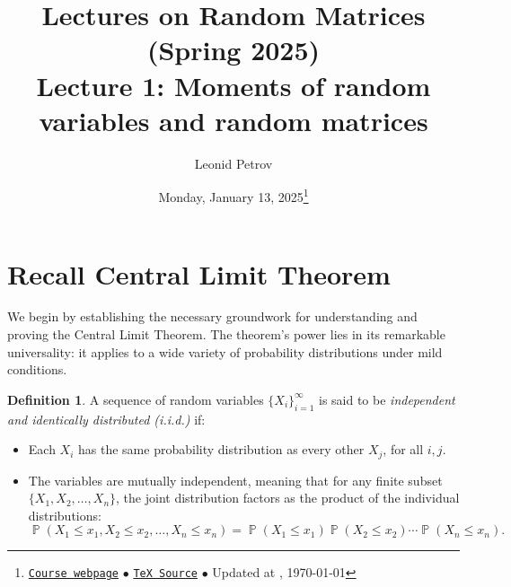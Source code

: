 \documentclass[letterpaper,11pt,oneside,reqno]{article}
\numberwithin{equation}{section}
\theoremstyle{definition}
\newtheorem{definition}[proposition]{Definition}
\begin{document}
\title{Lectures on Random Matrices
(Spring 2025)
\\Lecture 1: Moments of random variables and random
matrices}


\date{Monday, January 13, 2025\footnote{\href{https://lpetrov.cc/rmt25/}{\texttt{Course webpage}}
$\bullet$ \href{https://lpetrov.cc/rmt25/rmt25-notes/rmt2025-l01.tex}{\texttt{TeX Source}} 
$\bullet$
Updated at \currenttime, \today}}



\author{Leonid Petrov}


\maketitle



\section{Recall Central Limit Theorem}

We begin by establishing the necessary groundwork for understanding and proving 
the Central Limit Theorem. The theorem's power lies in its remarkable universality: 
it applies to a wide variety of probability distributions under mild conditions.

\begin{definition}
A sequence of random variables $\{X_i\}_{i=1}^{\infty}$ is said to be 
\emph{independent and identically distributed (i.i.d.)} 
if:

\begin{itemize}
    \item Each $X_i$ has the same probability distribution as every other $X_j$, for all $i, j$.
    \item The variables are mutually independent, meaning that for any finite subset $\{X_1, X_2, \dots, X_n\}$, the joint distribution factors as the product of the individual distributions:
    \[
			\operatorname{\mathbb{P}}(X_1 \leq x_1, X_2 \leq x_2, \dots, X_n \leq x_n) 
			=
			\operatorname{\mathbb{P}}(X_1 \leq x_1) 
			\operatorname{\mathbb{P}}(X_2 \leq x_2) \cdots \operatorname{\mathbb{P}}(X_n \leq x_n).
    \]
\end{itemize}
\end{definition}
\end{document}
